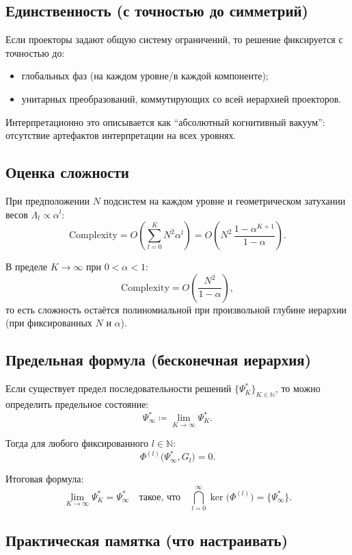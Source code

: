 \documentclass[11pt]{article}
\begin{document}
\subsection{Единственность (с точностью до симметрий)}

Если проекторы задают общую систему ограничений, то решение фиксируется с точностью до:
\begin{itemize}[leftmargin=*, itemsep=2pt]
  \item глобальных фаз (на каждом уровне/в каждой компоненте);
  \item унитарных преобразований, коммутирующих со всей иерархией проекторов.
\end{itemize}

Интерпретационно это описывается как ``абсолютный когнитивный вакуум'': отсутствие артефактов интерпретации на всех уровнях.

\subsection{Оценка сложности}

При предположении $N$ подсистем на каждом уровне и геометрическом затухании весов $\Lambda_l\propto\alpha^l$:
\[
\text{Complexity}
= O\left(\sum_{l=0}^{K} N^2\alpha^l\right)
= O\left(N^2\,\frac{1-\alpha^{K+1}}{1-\alpha}\right).
\]

В пределе $K\to\infty$ при $0<\alpha<1$:
\[
\text{Complexity}=O\left(\frac{N^2}{1-\alpha}\right),
\]
то есть сложность остаётся полиномиальной при произвольной глубине иерархии (при фиксированных $N$ и $\alpha$).

\subsection{Предельная формула (бесконечная иерархия)}

Если существует предел последовательности решений $\{\Psi_K^*\}_{K\in\mathbb{N}}$, то можно определить предельное состояние:
\[
\Psi_{\infty}^*\coloneqq \lim_{K\to\infty}\Psi_K^*.
\]

Тогда для любого фиксированного $l\in\mathbb{N}$:
\[
\Phi^{(l)}\bigl(\Psi_{\infty}^*,G_l\bigr)=0.
\]

Итоговая формула:
\[
\boxed{
\lim_{K\to\infty}\Psi_K^* = \Psi_{\infty}^*
\quad\text{такое, что}\quad
\bigcap_{l=0}^{\infty}\ker\bigl(\Phi^{(l)}\bigr)=\{\Psi_{\infty}^*\}
}.
\]

\subsection{Практическая памятка (что настраивать)}
\end{document}
